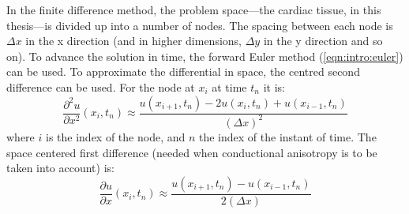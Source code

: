 In the finite difference method, the problem space---the cardiac tissue, in this
thesis---is divided up into a number of nodes.
The spacing between each node is $\Delta x$ in the x direction (and in higher
dimensions,  $\Delta y$ in the y direction and so on).
To advance the solution in time, the forward Euler method
(\ref{eqn:intro:euler}) can be used.
To approximate the differential in space, the centred second difference can be
used.
For the node at $x_i$ at time $t_n$ it is:
\begin{equation}
\label{eqn:intro:fd:secondcentral}
\frac{\partial^2 u}{\partial x^2}\left(x_i, t_n\right) \approx \frac{u(x_{i+1},t_n) - 2u(x_{i},t_n) + u(x_{i-1},t_n) }{\left(\Delta x\right)^2}
\end{equation}
where $i$ is the index of the node, and $n$ the index of the instant of time.
The space centered first difference (needed when conductional anisotropy is to
be taken into account) is:
\begin{equation}
\label{eqn:intro:fd:firstcentral}
\frac{\partial u}{\partial x}\left(x_i, t_n\right) \approx \frac{u(x_{i+1},t_n) - u(x_{i-1},t_n) }{2\left(\Delta x\right)}
\end{equation}


